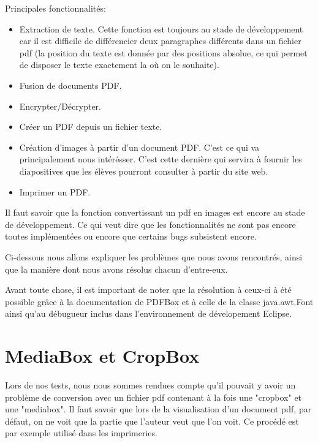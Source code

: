     Principales fonctionnalités:
    \begin{itemize}
    \item Extraction de texte.
           Cette fonction est toujours au stade de développement car il est difficile de 
           différencier deux paragraphes différents dans un fichier pdf (la position 
           du texte est donnée par des positions absolue, ce qui permet de disposer 
           le texte exactement la où on le souhaite).  
	\item Fusion de documents PDF. 
	\item Encrypter/Décrypter.
	\item Créer un PDF depuis un fichier texte.
	\item Création d'images à partir d'un document PDF. C'est ce qui va 
           principalement nous intérésser. C'est cette dernière qui servira à 
           fournir les diapositives que les élèves pourront consulter à partir 
           du site web.
	\item Imprimer un PDF.
	\end{itemize}

	Il faut savoir que la fonction convertissant un pdf en images est encore
    au stade de développement. Ce qui veut dire que  les fonctionnalités ne sont 
    pas encore toutes implémentées ou encore que certains bugs subsistent encore.

        Ci-dessous nous allons expliquer les problèmes que nous avons rencontrés,
    ainsi que la manière dont nous avons résolus chacun d'entre-eux.

        Avant toute chose, il est important de noter que la résolution à ceux-ci
    à été possible grâce à la documentation de PDFBox et à celle de la classe 
    java.awt.Font ainsi qu'au débugueur inclus dans l'environnement de dévelopement 
    Eclipse.


	\section{MediaBox et CropBox}
        Lors de nos tests, nous nous sommes rendues compte qu'il pouvait y 
    avoir un problème de conversion avec un fichier pdf contenant à la fois une 
    "cropbox" et une "mediabox". Il faut savoir que lors de la visualisation d'un 
    document pdf, par défaut, on ne voit que la partie que l'auteur veut que l'on 
    voit. Ce procédé est par exemple utilisé dans les imprimeries. 

